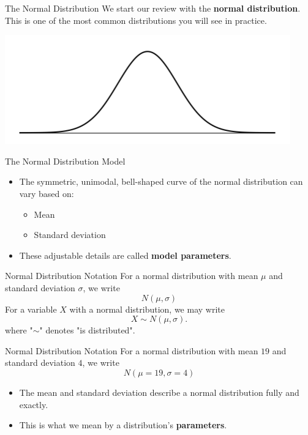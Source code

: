 \begin{frame}{The Normal Distribution}
    We start our review with the \textbf{normal distribution}. This is one of the most common distributions you will see in practice.
    
    \begin{center}
        \includegraphics[scale=0.5]{images/normalcurve.png}
    \end{center}
\end{frame}

\begin{frame}{The Normal Distribution Model}
    \begin{itemize}
        \item The symmetric, unimodal, bell-shaped curve of the normal distribution can vary based on:
        \begin{itemize}
            \item Mean
            \item Standard deviation
        \end{itemize}
        \item These adjustable details are called \textbf{model parameters}.
    \end{itemize}
\end{frame}

\begin{frame}{Normal Distribution Notation}
    For a normal distribution with mean $\mu$ and standard deviation $\sigma$, we write
    \[
        N(\mu, \sigma)
    \]
    For a variable $X$ with a normal distribution, we may write
    \[
        X \sim N(\mu, \sigma).
    \]
    where "$\sim$" denotes "is distributed".
\end{frame}

\begin{frame}{Normal Distribution Notation}
    For a normal distribution with mean $19$ and standard deviation $4$, we write
    \[
        N(\mu=19, \sigma=4)
    \]
    \begin{itemize}
        \item The mean and standard deviation describe a normal distribution fully and exactly. 
        \item This is what we mean by a distribution's \textbf{parameters}.
    \end{itemize}
\end{frame}

